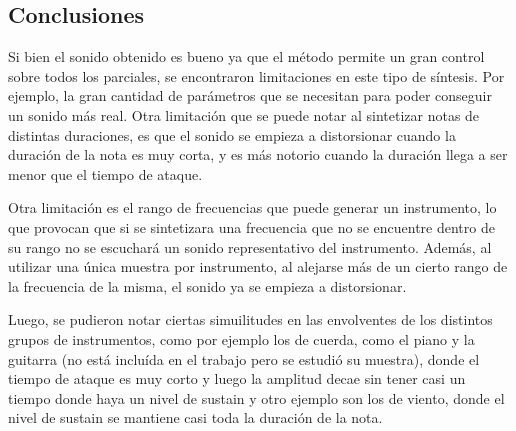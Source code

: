 \documentclass[assd_tp2_main.tex]{subfiles}
\begin{document}
\subsection{Conclusiones}

Si bien el sonido obtenido es bueno ya que el método permite un gran control sobre todos los parciales, se encontraron limitaciones en este tipo de síntesis. Por ejemplo, la gran cantidad de parámetros que se necesitan para poder conseguir un sonido más real. Otra limitación que se puede notar al sintetizar notas de distintas duraciones, es que el sonido se empieza a distorsionar cuando la duración de la nota es muy corta, y es más notorio cuando la duración llega a ser menor que el tiempo de ataque.

Otra limitación es el rango de frecuencias que puede generar un instrumento, lo que provocan que si se sintetizara una frecuencia que no se encuentre dentro de su rango no se escuchará un sonido representativo del instrumento. Además, al utilizar una única muestra por instrumento, al alejarse más de un cierto rango de la frecuencia de la misma, el sonido ya se empieza a distorsionar.

Luego, se pudieron notar ciertas simuilitudes en las envolventes de los distintos grupos de instrumentos, como por ejemplo los de cuerda, como el piano y la guitarra (no está incluída en el trabajo pero se estudió su muestra), donde el tiempo de ataque es muy corto y luego la amplitud decae sin tener casi un tiempo donde haya un nivel de sustain y otro ejemplo son los de viento, donde el nivel de sustain se mantiene casi toda la duración de la nota.
\end{document}
